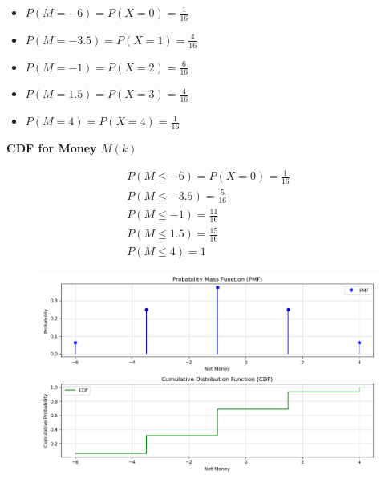 \documentclass[journal]{IEEEtran}
\numberwithin{equation}{enumi}
\numberwithin{figure}{enumi}
\begin{document}
\begin{itemize}
    \item \( P(M = -6) = P(X = 0) = \frac{1}{16} \)
    \item \( P(M = -3.5) = P(X = 1) = \frac{4}{16} \)
    \item \( P(M = -1) = P(X = 2) = \frac{6}{16} \)
    \item \( P(M = 1.5) = P(X = 3) = \frac{4}{16} \)
    \item \( P(M = 4) = P(X = 4) = \frac{1}{16} \)
\end{itemize}

 \textbf{CDF for Money \( M(k) \)}

\begin{align}
P(M \leq -6) = P(X = 0) = \frac{1}{16} \\
P(M \leq -3.5)   = \frac{5}{16}\\
P(M \leq -1)  = \frac{11}{16}\\
P(M \leq 1.5) =  \frac{15}{16}\\
P(M \leq 4)  = 1
\end{align}


\begin{figure}[h!]
   \centering
   \includegraphics[width=0.7\linewidth]{figs/Figure_1.png}
\end{figure}
\end{document}
